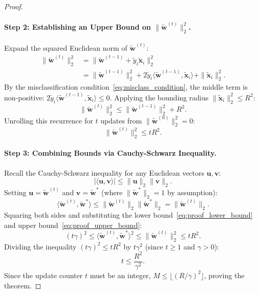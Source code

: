 \documentclass[11pt]{article}
\begin{document}
\begin{proof}
\paragraph{Step 2: Establishing an Upper Bound on $\|\tilde{\mathbf{w}}^{(t)}\|_2^2$.}
Expand the squared Euclidean norm of $\tilde{\mathbf{w}}^{(t)}$:
\begin{align}
\|\tilde{\mathbf{w}}^{(t)}\|_2^2 &= \|\tilde{\mathbf{w}}^{(t-1)} + \tilde{y}_i \tilde{\mathbf{x}}_i\|_2^2 \nonumber \\
&= \|\tilde{\mathbf{w}}^{(t-1)}\|_2^2 + 2 \tilde{y}_i \langle \tilde{\mathbf{w}}^{(t-1)}, \tilde{\mathbf{x}}_i \rangle + \|\tilde{\mathbf{x}}_i\|_2^2.
\end{align}
By the misclassification condition~\eqref{eq:misclass_condition}, the middle term is non-positive: $2 \tilde{y}_i \langle \tilde{\mathbf{w}}^{(t-1)}, \tilde{\mathbf{x}}_i \rangle \le 0$. Applying the bounding radius $\|\tilde{\mathbf{x}}_i\|_2^2 \le R^2$:
\begin{equation}
\|\tilde{\mathbf{w}}^{(t)}\|_2^2 \le \|\tilde{\mathbf{w}}^{(t-1)}\|_2^2 + R^2.
\end{equation}
Unrolling this recurrence for $t$ updates from $\|\tilde{\mathbf{w}}^{(0)}\|_2^2 = 0$:
\begin{equation}
\label{eq:proof_upper_bound}
\|\tilde{\mathbf{w}}^{(t)}\|_2^2 \le t R^2.
\end{equation}

\paragraph{Step 3: Combining Bounds via Cauchy-Schwarz Inequality.}
Recall the Cauchy-Schwarz inequality for any Euclidean vectors $\mathbf{u}, \mathbf{v}$:
\begin{equation}
|\langle \mathbf{u}, \mathbf{v} \rangle| \le \|\mathbf{u}\|_2 \|\mathbf{v}\|_2.
\end{equation}
Setting $\mathbf{u} = \tilde{\mathbf{w}}^{(t)}$ and $\mathbf{v} = \tilde{\mathbf{w}}^*$ (where $\|\tilde{\mathbf{w}}^*\|_2 = 1$ by assumption):
\begin{equation}
\langle \tilde{\mathbf{w}}^{(t)}, \tilde{\mathbf{w}}^* \rangle \le \|\tilde{\mathbf{w}}^{(t)}\|_2 \|\tilde{\mathbf{w}}^*\|_2 = \|\tilde{\mathbf{w}}^{(t)}\|_2.
\end{equation}
Squaring both sides and substituting the lower bound~\eqref{eq:proof_lower_bound} and upper bound~\eqref{eq:proof_upper_bound}:
\begin{equation}
(t \gamma)^2 \le \langle \tilde{\mathbf{w}}^{(t)}, \tilde{\mathbf{w}}^* \rangle^2 \le \|\tilde{\mathbf{w}}^{(t)}\|_2^2 \le t R^2.
\end{equation}
Dividing the inequality $(t \gamma)^2 \le t R^2$ by $t \gamma^2$ (since $t \ge 1$ and $\gamma > 0$):
\begin{equation}
t \le \frac{R^2}{\gamma^2}.
\end{equation}
Since the update counter $t$ must be an integer, $M \le \lfloor (R/\gamma)^2 \rfloor$, proving the theorem.
\end{proof}
\end{document}
